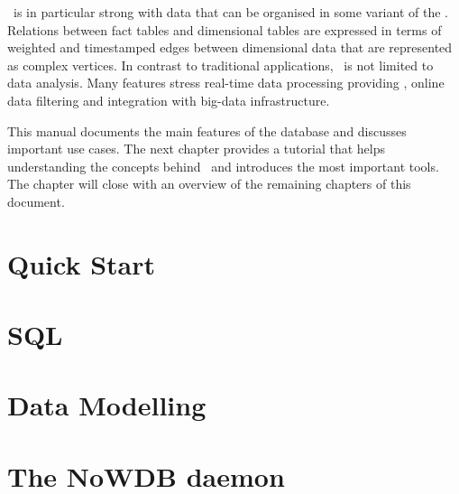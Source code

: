 \documentclass{scrreprt}
\begin{document}
\nowdb\ is in particular strong with
data that can be organised in some variant of the
. Relations between
fact tables and dimensional tables
are expressed in terms of
weighted and timestamped edges
between dimensional data that
are represented as complex vertices.
In contrast to traditional
 applications,
\nowdb\ is not limited to data analysis.
Many features stress real-time data
processing providing ,
online data filtering and integration with big-data
infrastructure.

\newpage
This manual documents the main features
of the database and discusses important
use cases. The next chapter provides
a  tutorial that helps
understanding the concepts behind \nowdb\
and introduces the most important tools.
The chapter will close
with an overview of the remaining
chapters of this document.


\chapter{Quick Start}\label{chpt_quickst}


\chapter{SQL}\label{chpt_sql}


\chapter{Data Modelling}\label{chpt_model}

\chapter{The NoWDB daemon}\label{chpt_nowdbd}
\end{document}
